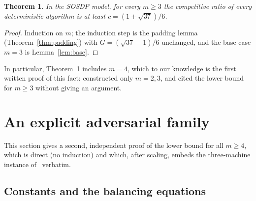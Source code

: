 \documentclass[11pt]{article}
\newtheorem{theorem}{Theorem}
\theoremstyle{definition}
\begin{document}
\begin{theorem}
\label{thm:main}
In the SOSDP model, for every $m\ge3$ the competitive ratio of every
deterministic algorithm is at least $c=(1+\sqrt{37})/6$.
\end{theorem}
\begin{proof}
Induction on $m$; the induction step is the padding lemma
(Theorem~\ref{thm:padding}) with $G=(\sqrt{37}-1)/6$ unchanged, and the base
case $m=3$ is Lemma~\ref{lem:base}.
\end{proof}

In particular, Theorem~\ref{thm:main} includes $m=4$, which to our knowledge
is the first written proof of this fact: \cite{SSW00} constructed only
$m=2,3$, and \cite{CKK12} cited the lower bound for $m\ge3$ without giving an
argument.

\section{An explicit adversarial family}
\label{sec:explicit}

This section gives a second, independent proof of the lower bound for all
$m\ge4$, which is direct (no induction) and which, after scaling, embeds the
three-machine instance of~\cite{SSW00} verbatim.

\subsection{Constants and the balancing equations}
\end{document}
